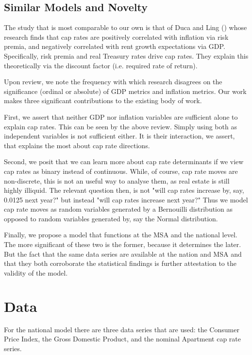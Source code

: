 \subsection{Similar Models and Novelty}

The study that is most comparable to our own is that of Duca and Ling (\citeyear{duca2017taxes}) whose research finds that cap rates are positively correlated with inflation via risk premia, and negatively correlated with rent growth expectations via GDP. Specifically, risk premia and real Treasury rates drive cap rates. They explain this theoretically via the discount factor (i.e. required rate of return).

Upon review, we note the frequency with which research disagrees on the significance (ordinal or absolute) of GDP metrics and inflation metrics. Our work makes three significant contributions to the existing body of work. 

First, we assert that neither GDP nor inflation variables are sufficient alone to explain cap rates. This can be seen by the above review. Simply using both as independent variables is not sufficient either. It is their interaction, we assert, that explains the most about cap rate directions. 

Second, we posit that we can learn more about cap rate determinants if we view cap rates as binary instead of continuous. While, of course, cap rate moves are non-discrete, this is not an useful way to analyse them, as real estate is still highly illiquid. The relevant question then, is not "will cap rates increase by, say,  0.0125 next year?" but instead "will cap rates increase next year?" Thus we model cap rate moves as random variables generated by a Bernouilli distribution as opposed to random variables generated by, say the Normal distribution. 

Finally, we propose a model that functions at the MSA and the national level. The more significant of these two is the former, because it determines the later. But the fact that the same data series are available at the nation and MSA and that they both corroborate the statistical findings is further attestation to the validity of the model.

\section{Data}
For the national model there are three data series that are used: the Consumer Price Index, the Gross Domestic Product, and the nominal Apartment cap rate series. 

